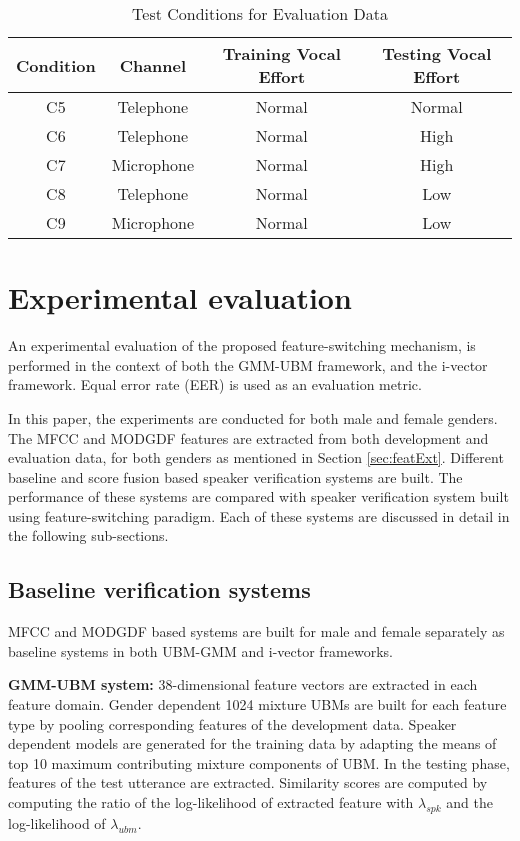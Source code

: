 \documentclass{article}
\begin{document}
\begin{table}[h!tb]
\centering
\caption{Test Conditions for Evaluation Data}
\begin{tabular}{|c|c|c|c|}
\hline
Condition & Channel & Training Vocal Effort & Testing Vocal Effort \\ 
\hline \hline
C5 & Telephone & Normal & Normal \\ \hline
C6 & Telephone & Normal & High \\ \hline
C7 & Microphone & Normal & High \\ \hline
C8 & Telephone & Normal & Low \\ \hline
C9 & Microphone & Normal & Low \\ \hline
\end{tabular}
\label{tab:testCond}
\end{table}

\section{Experimental evaluation}
\label{sec:ExpSetup}
An experimental evaluation of the proposed feature-switching
mechanism, is performed in the context of both the GMM-UBM framework, and the i-vector
framework. Equal error rate (EER) is used as an evaluation metric.

\vspace*{0.25cm}
In this paper, the experiments are conducted for both male and female genders. The MFCC and MODGDF features are extracted from both development and evaluation data, for both genders as mentioned in Section \ref{sec:featExt}. Different baseline and score fusion based speaker verification systems are built. The performance of these systems are compared with speaker verification system built using feature-switching paradigm. Each of these systems are discussed in detail in the following sub-sections. 

\subsection{Baseline verification systems}
\label{subsec:baseline}
MFCC and MODGDF based systems are built for male and female separately as baseline systems in both UBM-GMM and i-vector frameworks.  

\vspace*{0.25cm}

\textbf{GMM-UBM system:} 38-dimensional feature vectors are extracted in each feature domain. Gender dependent 1024 mixture UBMs are built for each feature type by pooling corresponding features of the development data. Speaker dependent models are generated for the training data by adapting the means of top 10 maximum contributing mixture components of UBM. In the testing phase, features of the test utterance are extracted. Similarity scores are computed by computing the ratio of the log-likelihood of extracted feature with $\lambda_{spk}$ and  the log-likelihood of $\lambda_{ubm}$. 
\end{document}
